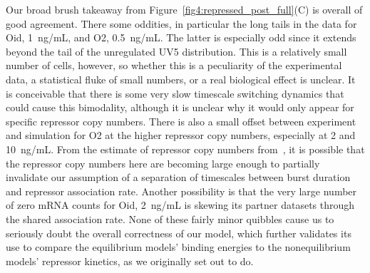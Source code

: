 Our broad brush takeaway from Figure~\ref{fig4:repressed_post_full}(C) is
overall of good agreement. There some oddities, in particular the long tails in
the data for Oid, 1~ng/mL, and O2, 0.5~ng/mL. The latter is especially odd since
it extends beyond the tail of the unregulated UV5 distribution. This is a
relatively small number of cells, however, so whether this is a peculiarity of
the experimental data, a statistical fluke of small numbers, or a real
biological effect is unclear. It is conceivable that there is some very slow
timescale switching dynamics that could cause this bimodality, although it is
unclear why it would only appear for specific repressor copy numbers. There is
also a small offset between experiment and simulation for O2 at the higher
repressor copy numbers, especially at 2 and 10~ng/mL.
From the estimate of repressor copy numbers from~\cite{Jones2014}, it is
possible that the repressor copy numbers here are becoming large enough to
partially invalidate our assumption of a separation of timescales between
burst duration and repressor association rate. Another possibility is that
the very large number of zero mRNA counts for Oid, 2~ng/mL is skewing its partner
datasets through the shared association rate.
None of these fairly minor quibbles cause us to
seriously doubt the overall correctness of our model, which further validates
its use to compare the equilibrium models' binding energies to the
nonequilibrium models' repressor kinetics, as we originally set out to do.